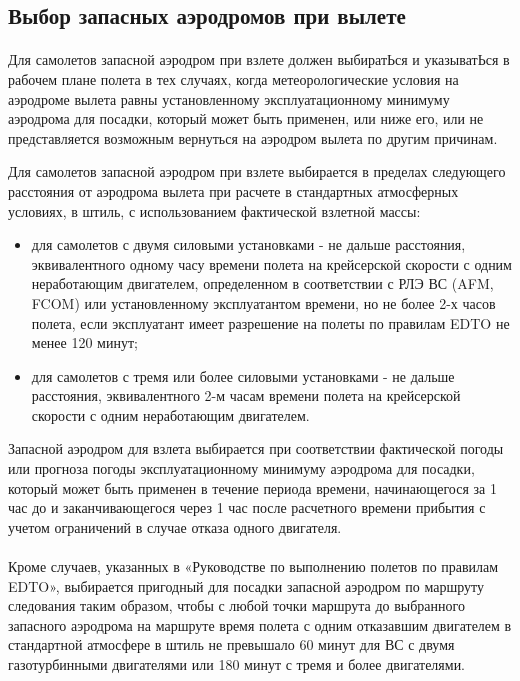 \subsection{Выбор запасных аэродромов при вылете}


\paragraph{} \label{par:altrule2} Для самолетов запасной аэродром при взлете должен выбиратЬся и указыватЬся в рабочем плане полета в тех случаях, когда метеорологические условия на аэродроме вылета равны установленному эксплуатационному минимуму аэродрома для посадки, который может быть применен, или ниже его, или не представляется возможным вернуться на аэродром вылета по другим причинам. 

Для самолетов запасной аэродром при взлете выбирается в пределах следующего расстояния от аэродрома вылета при расчете в стандартных атмосферных условиях, в штиль, с использованием фактической взлетной массы:
\begin{itemize}
    \item для самолетов с двумя силовыми установками - не дальше расстояния, эквивалентного одному часу времени полета на крейсерской скорости с одним неработающим двигателем, определенном в соответствии с РЛЭ ВС (AFM, FCOM) или установленному эксплуатантом времени, но не более 2-х часов полета, если эксплуатант имеет разрешение на полеты по правилам EDTO не менее 120 минут;
    \item для самолетов с тремя или более силовыми установками - не дальше расстояния, эквивалентного 2-м часам времени полета на крейсерской скорости с одним неработающим двигателем.
\end{itemize} 

Запасной аэродром для взлета выбирается при соответствии фактической погоды или прогноза погоды эксплуатационному минимуму аэродрома для посадки, который может быть применен в течение периода времени, начинающегося за 1 час до и заканчивающегося через 1 час после расчетного времени прибытия с учетом ограничений в случае отказа одного двигателя. 

\paragraph{} \label{par:altrule} Кроме случаев, указанных в «Руководстве по выполнению полетов по правилам EDTO», выбирается пригодный для посадки запасной аэродром по маршруту следования таким образом, чтобы с любой точки маршрута до выбранного запасного аэродрома на маршруте время полета с одним отказавшим двигателем в стандартной атмосфере в штиль не превышало 60 минут для ВС с двумя газотурбинными двигателями или 180 минут с тремя и более двигателями.

